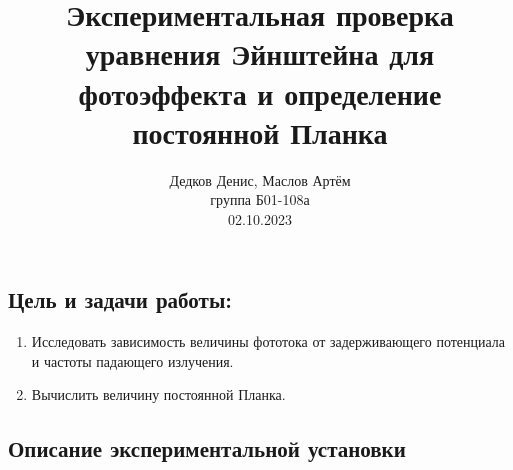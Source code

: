 \documentclass[10pt,a4paper]{article}
\author{\normalsize Дедков Денис, Маслов Артём \\
	\normalsize группа Б01-108а \\
	\normalsize 02.10.2023}
\date{}
\title{
	\Large Экспериментальная проверка уравнения Эйнштейна для фотоэффекта и определение постоянной Планка \\ 
}
\begin{document}
\maketitle
	
	\subsection*{Цель и задачи работы:}
	\begin{enumerate}
		\item Исследовать зависимость величины фототока от задерживающего потенциала и частоты падающего излучения.
		
		\item Вычислить величину постоянной Планка.
	\end{enumerate}
	
	\subsection*{Описание экспериментальной установки}
	
\end{document}
